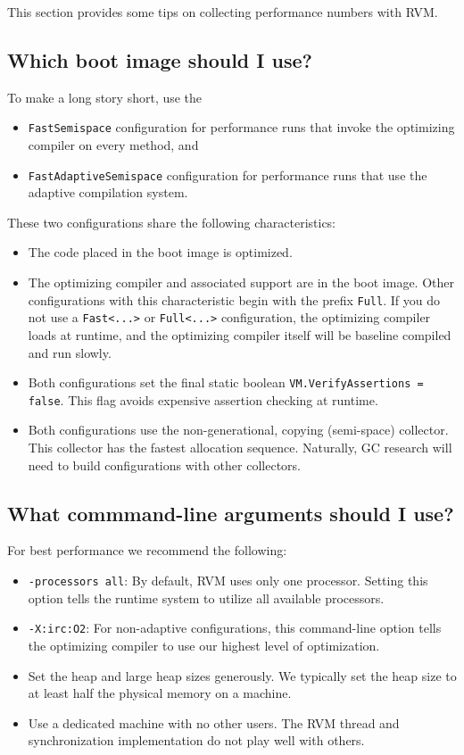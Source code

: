 This section provides some tips on collecting performance numbers with
RVM.

\subsection{Which boot image should I use?}

To make a long story short, use the
\begin{itemize}
\item {\tt FastSemispace} configuration for performance runs that invoke the optimizing compiler on every method, and
\item {\tt FastAdaptiveSemispace} configuration for performance runs that use the adaptive compilation system.
\end{itemize}

These two configurations share the following characteristics:

\begin{itemize}
\item The code placed in the boot image is optimized.
\item The optimizing compiler and associated support are in
the boot image.  Other
configurations with this characteristic begin with the prefix {\tt Full}.
If you do not use a {\tt Fast<...>} or {\tt Full<...>} configuration, 
the optimizing
compiler loads at runtime, and the optimizing compiler itself will be
baseline compiled and run slowly.
\item Both configurations set the final static boolean
{\tt VM.VerifyAssertions = false}.  This flag avoids expensive assertion
checking at runtime.
\item Both configurations use the non-generational, copying (semi-space) 
collector.  This collector has the fastest allocation sequence.  
Naturally, GC research will need to build configurations with other
collectors.
\end{itemize}

\subsection{What commmand-line arguments should I use?}

For best performance we recommend the following:

\begin{itemize}
\item {\tt -processors all}: By default, RVM uses only one processor.  Setting this option tells the runtime system to utilize all available processors.
\item {\tt -X:irc:O2}: For non-adaptive configurations, this command-line option tells the optimizing compiler to use our highest level of optimization.
\item Set the heap and large heap sizes generously.  We typically set the heap size to at least half the physical memory on a machine.
\item Use a dedicated machine with no other users.  The RVM thread and synchronization implementation do not play well with others.
\end{itemize}

